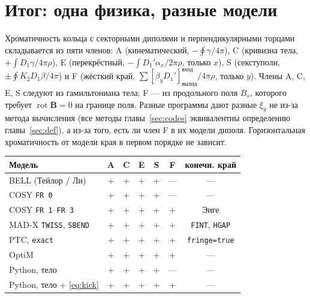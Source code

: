 \section{Итог: одна физика, разные модели}
\label{sec:summary}

Хроматичность кольца с секторными диполями и перпендикулярными торцами складывается из пяти членов: A (кинематический, $-\oint\gamma/4\pi$), C (кривизна тела, $+\int D_1\gamma/4\pi\rho$), E (перекрёстный, $-\int D_1'\alpha_x/2\pi\rho$, только $x$), S (секступоли, $\pm\oint K_2D_1\beta/4\pi$) и F (жёсткий край, $\sum[\beta_yD_1']^{\text{вход}}_{\text{выход}}/4\pi\rho$, только $y$). Члены A, C, E, S следуют из гамильтониана тела; F --- из продольного поля $B_s$, которого требует $\operatorname{rot}\mathbf{B}=0$ на границе поля. Разные программы дают разные $\xi_y$ не из-за метода вычисления (все методы главы~\ref{sec:codes} эквивалентны определению главы~\ref{sec:def}), а из-за того, есть ли член F в их модели диполя. Горизонтальная хроматичность от модели края в первом порядке не зависит.

\begin{center}
\small
\renewcommand{\arraystretch}{1.2}
\begin{tabular}{@{}lcccccc@{}}
\hline
Модель & A & C & E & S & F & конечн. край\\
\hline
BELL (Тейлор / Ли) & + & + & + & + & --- & ---\\
COSY \texttt{FR 0} & + & + & + & + & --- & ---\\
COSY \texttt{FR 1}--\texttt{FR 3} & + & + & + & + & + & Энге\\
MAD-X \texttt{TWISS}, \texttt{SBEND} & + & + & + & + & + & \texttt{FINT}, \texttt{HGAP}\\
PTC, \texttt{exact} & + & + & + & + & + & \texttt{fringe=true}\\
OptiM & + & + & + & + & + & ---\\
Python, тело & + & + & + & + & --- & ---\\
Python, тело + \eqref{eq:kick} & + & + & + & + & + & ---\\
\hline
\end{tabular}
\end{center}

